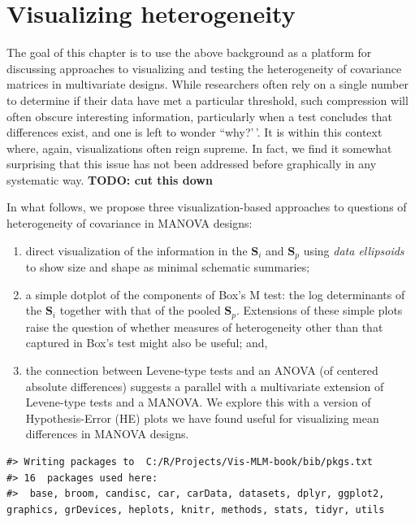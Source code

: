 \documentclass[
  letterpaper,
  10pt,
  krantz2]{krantz}
\begin{document}
\hypertarget{visualizing-heterogeneity}{%
\section{Visualizing heterogeneity}\label{visualizing-heterogeneity}}

The goal of this chapter is to use the above background as a platform
for discussing approaches to visualizing and testing the heterogeneity
of covariance matrices in multivariate designs. While researchers often
rely on a single number to determine if their data have met a particular
threshold, such compression will often obscure interesting information,
particularly when a test concludes that differences exist, and one is
left to wonder ``why?'\,'. It is within this context where, again,
visualizations often reign supreme. In fact, we find it somewhat
surprising that this issue has not been addressed before graphically in
any systematic way. \textbf{TODO: cut this down}

In what follows, we propose three visualization-based approaches to
questions of heterogeneity of covariance in MANOVA designs:

\begin{enumerate}
\def\labelenumi{(\alph{enumi})}
\item
  direct visualization of the information in the \(\mathbf{S}_i\) and
  \(\mathbf{S}_p\) using \emph{data ellipsoids} to show size and shape
  as minimal schematic summaries;
\item
  a simple dotplot of the components of Box's M test: the log
  determinants of the \(\mathbf{S}_i\) together with that of the pooled
  \(\mathbf{S}_p\). Extensions of these simple plots raise the question
  of whether measures of heterogeneity other than that captured in Box's
  test might also be useful; and,
\item
  the connection between Levene-type tests and an ANOVA (of centered
  absolute differences) suggests a parallel with a multivariate
  extension of Levene-type tests and a MANOVA. We explore this with a
  version of Hypothesis-Error (HE) plots we have found useful for
  visualizing mean differences in MANOVA designs.
\end{enumerate}

\begin{verbatim}
#> Writing packages to  C:/R/Projects/Vis-MLM-book/bib/pkgs.txt
#> 16  packages used here:
#>  base, broom, candisc, car, carData, datasets, dplyr, ggplot2, graphics, grDevices, heplots, knitr, methods, stats, tidyr, utils
\end{verbatim}
\end{document}
